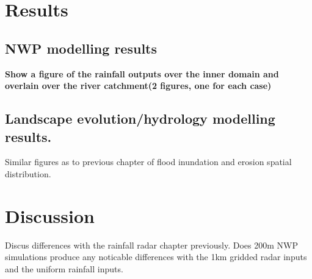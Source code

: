 \section{Results}

\subsection{NWP modelling results}

\textbf{Show a figure of the rainfall outputs over the inner domain and overlain over the river catchment(2 figures, one for each case)}

\subsection{Landscape evolution/hydrology modelling results.}

Similar figures as to previous chapter of flood inundation and erosion spatial distribution. 

\section{Discussion} 

Discus differences with the rainfall radar chapter previously. Does 200m NWP simulations produce any noticable differences with the 1km gridded radar inputs and the uniform rainfall inputs. 